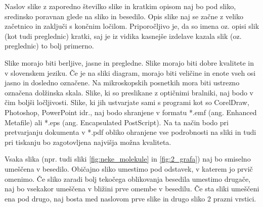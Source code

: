 Naslov slike z zaporedno številko slike in kratkim opisom naj bo pod sliko, sredinsko poravnan glede na sliko in besedilo. Opis slike naj se začne z veliko začetnico in zaključi s končnim ločilom. Priporočljivo je, da so imena oz. opisi slik (kot tudi preglednic) kratki, saj je iz vidika kasnejše izdelave kazala slik (oz. preglednic) to bolj primerno.

Slike morajo biti berljive, jasne in pregledne. Slike morajo biti dobre kvalitete in v slovenskem jeziku. Če je na sliki diagram, morajo biti veličine in enote vseh osi jasno in dosledno označene. Na mikroskopskih posnetkih mora biti ustrezno označena dolžinska skala. Slike, ki so preslikane z optičnimi bralniki, naj bodo v čim boljši ločljivosti. Slike, ki jih ustvarjate sami s programi kot so CorelDraw, Photoshop, PowerPoint idr., naj bodo shranjene v formatu *.emf (ang. Enhanced Metafile) ali *.eps (ang. Encapsulated PostScript). Na ta način bodo pri pretvarjanju dokumenta v *.pdf obliko ohranjene vse podrobnosti na sliki in tudi pri tiskanju bo zagotovljena najvišja možna kvaliteta.
	
Vsaka slika (npr. tudi sliki \ref{fig:neke_molekule} in \ref{fig:2_grafa}) naj bo smiselno umeščena v besedilo. Običajno sliko umestimo pod odstavek, v katerem jo prvič omenimo. Če sliko zaradi bolj tekočega oblikovanja besedila umestimo drugače, naj bo vsekakor umeščena v bližini prve omembe v besedilu. Če sta sliki umeščeni ena pod drugo, naj bosta med naslovom prve slike in drugo sliko 2 prazni vrstici.

